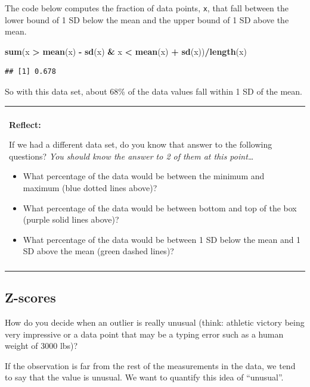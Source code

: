\documentclass[]{book}
\newenvironment{Shaded}{\begin{snugshade}}{\end{snugshade}}
\newcommand{\KeywordTok}[1]{\textcolor[rgb]{0.13,0.29,0.53}{\textbf{#1}}}
\newcommand{\NormalTok}[1]{#1}
\newcommand{\OperatorTok}[1]{\textcolor[rgb]{0.81,0.36,0.00}{\textbf{#1}}}
\newcommand{\StringTok}[1]{\textcolor[rgb]{0.31,0.60,0.02}{#1}}
\newenvironment{reflect}
{
    \begin{center}
    
    \begin{tabular}{|p{0.8\textwidth}|}
    \rowcolor{LightBlue}
    \hline\\
    \rowcolor{LightBlue}
    \textbf{Reflect:}
}
{
    \\\rowcolor{LightBlue}
    \\\hline
    \end{tabular} 
    \end{center}
}
\begin{document}
The code below computes the fraction of data points, \texttt{x}, that fall between the lower bound of 1 SD below the mean and the upper bound of 1 SD above the mean.

\begin{Shaded}
\begin{Highlighting}[]
\KeywordTok{sum}\NormalTok{(x }\OperatorTok{>}\StringTok{ }\KeywordTok{mean}\NormalTok{(x) }\OperatorTok{-}\StringTok{ }\KeywordTok{sd}\NormalTok{(x) }\OperatorTok{&}\StringTok{ }\NormalTok{x }\OperatorTok{<}\StringTok{ }\KeywordTok{mean}\NormalTok{(x) }\OperatorTok{+}\StringTok{ }\KeywordTok{sd}\NormalTok{(x))}\OperatorTok{/}\KeywordTok{length}\NormalTok{(x)}
\end{Highlighting}
\end{Shaded}

\begin{verbatim}
## [1] 0.678
\end{verbatim}

So with this data set, about 68\% of the data values fall within 1 SD of the mean.

\begin{reflect}
If we had a different data set, do you know that answer to the following
questions? \emph{You should know the answer to 2 of them at this
point\ldots{}}

\begin{itemize}
\item
  What percentage of the data would be between the minimum and maximum
  (blue dotted lines above)?
\item
  What percentage of the data would be between bottom and top of the box
  (purple solid lines above)?
\item
  What percentage of the data would be between 1 SD below the mean and 1
  SD above the mean (green dashed lines)?
\end{itemize}
\end{reflect}

\hypertarget{z-scores}{%
\subsection{Z-scores}\label{z-scores}}

How do you decide when an outlier is really unusual (think: athletic victory being very impressive or a data point that may be a typing error such as a human weight of 3000 lbs)?

If the observation is far from the rest of the measurements in the data, we tend to say that the value is unusual. We want to quantify this idea of ``unusual''.
\end{document}
